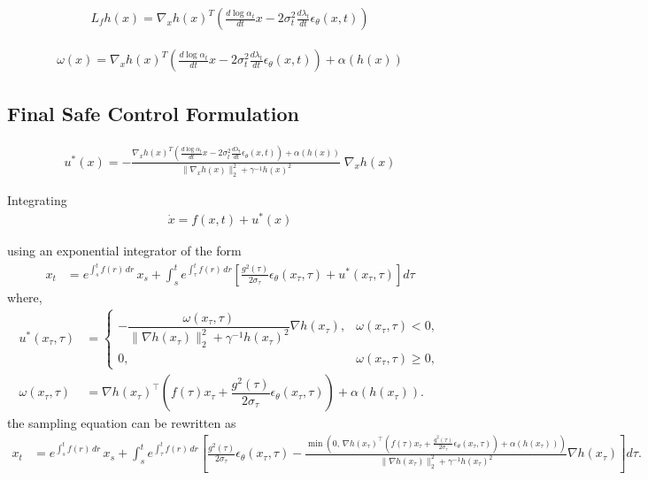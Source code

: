\documentclass{article}
\begin{document}
\begin{align}
L_f h(x)
=
\nabla_x h(x)^T
\left(
\frac{d \log \alpha_t}{dt} x
-
2\sigma_t^2 \frac{d\lambda_t}{dt}\epsilon_\theta(x,t)
\right)
\end{align}

\begin{align}
\omega(x)
=
\nabla_x h(x)^T
\left(
\frac{d \log \alpha_t}{dt} x
-
2\sigma_t^2 \frac{d\lambda_t}{dt}\epsilon_\theta(x,t)
\right)
+
\alpha(h(x))
\end{align}

\subsection{Final Safe Control Formulation}

\begin{align}
u^*(x)
=
-
\frac{
\nabla_x h(x)^T
\left(
\frac{d \log \alpha_t}{dt} x
-
2\sigma_t^2 \frac{d\lambda_t}{dt}\epsilon_\theta(x,t)
\right)
+
\alpha(h(x))
}
{
\|\nabla_x h(x)\|_2^2
+
\gamma^{-1} h(x)^2
}
\;
\nabla_x h(x)
\end{align}

Integrating
\begin{align}
\dot{x}
=
f(x,t)
+
u^*(x)
\end{align}

using an exponential integrator of the form 
\begin{align}
x_t
&=
e^{\int_s^t f(r)\,dr}\,x_s
+
\int_s^t
e^{\int_\tau^t f(r)\,dr}
\left[
\frac{g^2(\tau)}{2\sigma_\tau}\epsilon_\theta(x_\tau,\tau)
+
u^*(x_\tau,\tau)
\right] d\tau
\end{align}
where,
\begin{align}
u^*(x_\tau,\tau)
&=
\begin{cases}
-\dfrac{
\omega(x_\tau,\tau)
}{
\|\nabla h(x_\tau)\|_2^2+\gamma^{-1}h(x_\tau)^2
}\nabla h(x_\tau),
& \omega(x_\tau,\tau)<0,\\[1.2ex]
0, & \omega(x_\tau,\tau)\ge 0,
\end{cases}
\\[1ex]
\omega(x_\tau,\tau)
&=
\nabla h(x_\tau)^\top
\left(
f(\tau)x_\tau+\dfrac{g^2(\tau)}{2\sigma_\tau}\epsilon_\theta(x_\tau,\tau)
\right)
+\alpha(h(x_\tau)).
\end{align}
the sampling equation can be rewritten as 
\begin{align}
x_t
&=
e^{\int_s^t f(r)\,dr}\,x_s
+
\int_s^t
e^{\int_\tau^t f(r)\,dr}
\left[
\frac{g^2(\tau)}{2\sigma_\tau}\epsilon_\theta(x_\tau,\tau)
-
\frac{
\min\!\left(
0,\,
\nabla h(x_\tau)^\top
\left(
f(\tau)x_\tau+\frac{g^2(\tau)}{2\sigma_\tau}\epsilon_\theta(x_\tau,\tau)
\right)
+\alpha(h(x_\tau))
\right)
}{
\|\nabla h(x_\tau)\|_2^2+\gamma^{-1}h(x_\tau)^2
}
\nabla h(x_\tau)
\right]d\tau.
\end{align}
\end{document}
